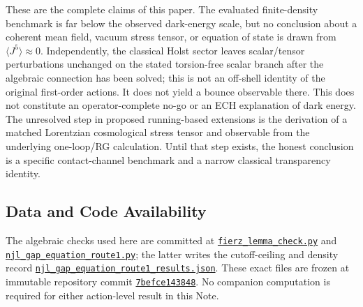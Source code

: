\documentclass[aps,prd,twocolumn,superscriptaddress,preprintnumbers,nofootinbib,longbibliography,floatfix]{revtex4-2}
\newcommand{\artifactpinned}[2]{\href{https://github.com/Hubify-Projects/bigbounce/blob/7befce143848b925998a3e6ecc850aa510ab3a94/#1}{\nolinkurl{#2}}}
\begin{document}
These are the complete claims of this paper.  The evaluated finite-density
benchmark is far below the observed dark-energy scale, but no conclusion about
a coherent mean field, vacuum stress tensor, or equation of state is drawn
from $\langle J^5\rangle\approx0$.  Independently, the classical Holst sector
leaves scalar/tensor perturbations unchanged on the stated torsion-free scalar
branch after the algebraic connection has been solved; this is not an off-shell
identity of the original first-order actions.  It does not yield a bounce
observable there.  This does not constitute
an operator-complete no-go or an ECH explanation of dark energy.  The unresolved
step in proposed running-based extensions is the derivation of a matched
Lorentzian cosmological stress tensor and observable from the underlying
one-loop/RG calculation.  Until that step exists, the honest conclusion is a
specific contact-channel benchmark and a narrow classical transparency
identity.

\subsection*{Data and Code Availability}

The algebraic checks used here are committed at
\artifactpinned{arxiv/scripts/fierz_lemma_check.py}{fierz_lemma_check.py} and
\artifactpinned{arxiv/scripts/njl_gap_equation_route1.py}{njl_gap_equation_route1.py}; the latter writes the
cutoff-ceiling and density record
\artifactpinned{arxiv/scripts/njl_gap_equation_route1_results.json}{njl_gap_equation_route1_results.json}.  These exact files are frozen at immutable
repository commit
\href{https://github.com/Hubify-Projects/bigbounce/tree/7befce143848b925998a3e6ecc850aa510ab3a94}{\texttt{7befce143848}}.
No companion computation is
required for either action-level result in this Note.

\appendix
\end{document}
